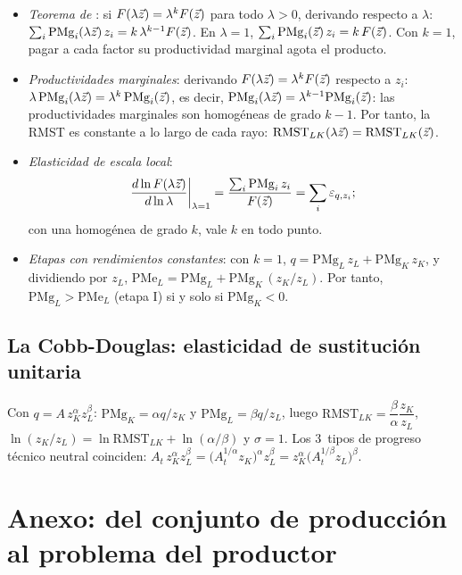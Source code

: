 \documentclass[11pt]{article}
\begin{document}
\begin{itemize}
\item \emph{Teorema de }: si $F(\lambda\vec{z})=\lambda^kF(\vec{z})$ para todo $\lambda>0$, derivando respecto a $\lambda$: $\sum_i\mathrm{PMg}_i(\lambda\vec{z})\,z_i=k\,\lambda^{k-1}F(\vec{z})$. En $\lambda=1$, $\sum_i\mathrm{PMg}_i(\vec{z})\,z_i=k\,F(\vec{z})$. Con $k=1$, pagar a cada factor su productividad marginal agota el producto.\findemo
\item \emph{Productividades marginales}: derivando $F(\lambda\vec{z})=\lambda^kF(\vec{z})$ respecto a $z_i$: $\lambda\,\mathrm{PMg}_i(\lambda\vec{z})=\lambda^k\,\mathrm{PMg}_i(\vec{z})$, es decir, $\mathrm{PMg}_i(\lambda\vec{z})=\lambda^{k-1}\mathrm{PMg}_i(\vec{z})$: las productividades marginales son homogéneas de grado $k-1$. Por tanto, la RMST es constante a lo largo de cada rayo: $\mathrm{RMST}_{LK}(\lambda\vec{z})=\mathrm{RMST}_{LK}(\vec{z})$.\findemo
\item \emph{Elasticidad de escala local}:
  \[
  \left.\frac{d\ln F(\lambda\vec{z})}{d\ln\lambda}\right|_{\lambda=1}=\frac{\sum_i\mathrm{PMg}_i\,z_i}{F(\vec{z})}=\sum_i\varepsilon_{q,z_i};
  \]
  con una homogénea de grado $k$, vale $k$ en todo punto.\findemo
\item \emph{Etapas con rendimientos constantes}: con $k=1$, $q=\mathrm{PMg}_L\,z_L+\mathrm{PMg}_K\,z_K$, y dividiendo por $z_L$, $\mathrm{PMe}_L=\mathrm{PMg}_L+\mathrm{PMg}_K\,(z_K/z_L)$. Por tanto, $\mathrm{PMg}_L>\mathrm{PMe}_L$ (etapa I) si y solo si $\mathrm{PMg}_K<0$.\findemo
\end{itemize}

\subsection{La Cobb-Douglas: elasticidad de sustitución unitaria}\label{der:cobb-douglas}

Con $q=A\,z_K^{\alpha}z_L^{\beta}$: $\mathrm{PMg}_K=\alpha q/z_K$ y $\mathrm{PMg}_L=\beta q/z_L$, luego $\mathrm{RMST}_{LK}=\dfrac{\beta}{\alpha}\dfrac{z_K}{z_L}$, $\ln(z_K/z_L)=\ln \mathrm{RMST}_{LK}+\ln(\alpha/\beta)$ y $\sigma=1$. Los 3~tipos de progreso técnico neutral coinciden: $A_t\,z_K^{\alpha}z_L^{\beta}=\big(A_t^{1/\alpha}z_K\big)^{\alpha}z_L^{\beta}=z_K^{\alpha}\big(A_t^{1/\beta}z_L\big)^{\beta}$.\findemo

\section{Anexo: del conjunto de producción\cortetitulo{} al problema del productor}\label{anexo:productor}
\end{document}
